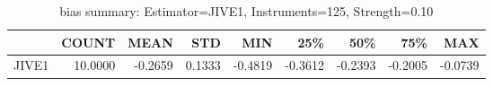 \begin{table}[ht]
\centering
\caption{bias summary: Estimator=JIVE1, Instruments=125, Strength=0.10}
\begin{tabular}{lrrrrrrrr}
\toprule
 & COUNT & MEAN & STD & MIN & 25\% & 50\% & 75\% & MAX \\
\midrule
JIVE1 & 10.0000 & -0.2659 & 0.1333 & -0.4819 & -0.3612 & -0.2393 & -0.2005 & -0.0739 \\
\bottomrule
\end{tabular}
\end{table}

